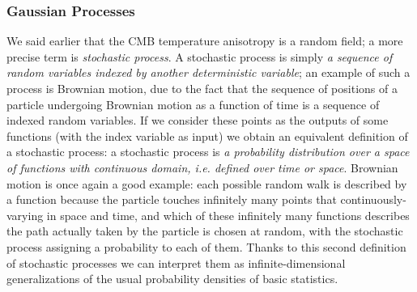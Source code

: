 \subsubsection{Gaussian Processes}
We said earlier that the CMB temperature anisotropy is a random field; a more precise term is \emph{stochastic process}. A stochastic process is simply \emph{a sequence of random variables indexed by another deterministic variable}; an example of such a process is Brownian motion, due to the fact that the sequence of positions of a particle undergoing Brownian motion as a function of time is a sequence of indexed random variables. If we consider these points as the outputs of some functions (with the index variable as input) we obtain an equivalent definition of a stochastic process: a stochastic process is \emph{a probability distribution over a space of functions with continuous domain, i.e. defined over time or space}. Brownian motion is once again a good example: each possible random walk is described by a function because the particle touches infinitely many points that continuously-varying in space and time, and which of these infinitely many functions describes the path actually taken by the particle is chosen at random, with the stochastic process assigning a probability to each of them. Thanks to this second definition of stochastic processes we can interpret them as infinite-dimensional generalizations of the usual probability densities of basic statistics.

